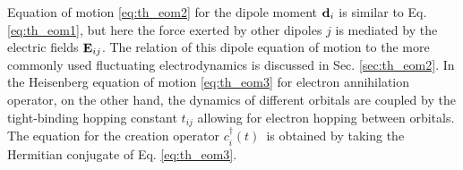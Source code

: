 Equation of motion \eqref{eq:th_eom2} for the dipole moment $\mathbf{d}_i$ is similar to Eq. \eqref{eq:th_eom1}, but here the force exerted by other dipoles $j$ is mediated by the electric fields $\mathbf{E}_{ij}$. The relation of this dipole equation of motion to the more commonly used fluctuating electrodynamics \cite{joulain05} is discussed in Sec. \ref{sec:th_eom2}. In the Heisenberg equation of motion \eqref{eq:th_eom3} for electron annihilation operator, on the other hand, the dynamics of different orbitals are coupled by the tight-binding hopping constant $t_{ij}$ allowing for electron hopping between orbitals. The equation for the creation operator $c_i^{\dagger}(t)$ is obtained by taking the Hermitian conjugate of Eq. \eqref{eq:th_eom3}.

